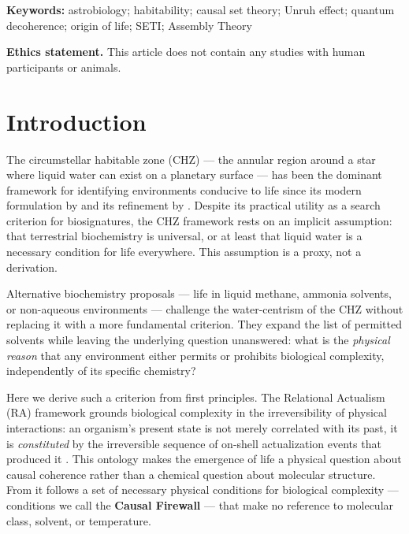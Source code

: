 \documentclass[11pt,a4paper]{article}
\theoremstyle{plain}
\theoremstyle{definition}
\theoremstyle{remark}
\begin{document}
\noindent\textbf{Keywords:} astrobiology; habitability; causal set theory;
Unruh effect; quantum decoherence; origin of life; SETI; Assembly Theory

\medskip
\noindent\textbf{Ethics statement.}
This article does not contain any studies with human participants or animals.

\section{Introduction}
\label{sec:intro}

The circumstellar habitable zone (CHZ) --- the annular region around a star
where liquid water can exist on a planetary surface --- has been the dominant
framework for identifying environments conducive to life since its modern
formulation by \citet{Kasting1993} and its refinement by \citet{Kopparapu2013}.
Despite its practical utility as a search criterion for biosignatures, the
CHZ framework rests on an implicit assumption: that terrestrial biochemistry
is universal, or at least that liquid water is a necessary condition for
life everywhere. This assumption is a proxy, not a derivation.

Alternative biochemistry proposals --- life in liquid methane, ammonia solvents,
or non-aqueous environments \citep{Benner2004} --- challenge the water-centrism
of the CHZ without replacing it with a more fundamental criterion. They expand
the list of permitted solvents while leaving the underlying question unanswered:
what is the \emph{physical reason} that any environment either permits or
prohibits biological complexity, independently of its specific chemistry?

Here we derive such a criterion from first principles. The Relational Actualism
(RA) framework \citep{Sandeman2026RACI} grounds biological complexity in the
irreversibility of physical interactions: an organism's present state is not
merely correlated with its past, it is \emph{constituted} by the irreversible
sequence of on-shell actualization events that produced it
\citep{Sandeman2026RAQM}. This ontology makes the emergence of life a physical
question about causal coherence rather than a chemical question about molecular
structure. From it follows a set of necessary physical conditions for biological
complexity --- conditions we call the \textbf{Causal Firewall} --- that make
no reference to molecular class, solvent, or temperature.
\end{document}
